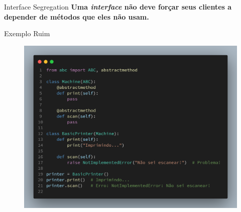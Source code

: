 \documentclass{libs/ufc_format}
\begin{document}
\begin{frame}{Interface Segregation}
    \centering
    \textbf{Uma \emph{interface} não deve forçar seus clientes a depender de
    métodos que eles não usam.}
\end{frame}

\begin{frame}{Exemplo \textcolor{gred}{Ruim}}
    \begin{figure}
        \centering
        \includegraphics[scale=0.13]{images/i_exemple_bad.png}
    \end{figure}
\end{frame}
\end{document}
